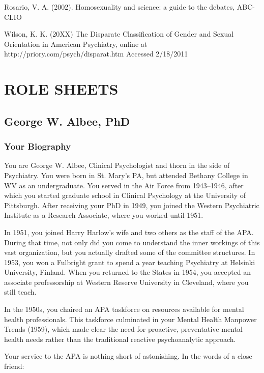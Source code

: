 Rosario, V. A. (2002). Homosexuality and science: a guide to the debates, ABC-CLIO

Wilson, K. K. (20XX) The Disparate Classification of Gender and Sexual Orientation in American Psychiatry, online at http:\slash \slash priory.com\slash psych\slash disparat.htm Accessed 2\slash 18\slash 2011

\pagebreak 

\part{ROLE SHEETS}
\label{rolesheets}

\chapter{George W. Albee, PhD}
\label{georgew.albeephd}

\section{Your Biography}
\label{yourbiography}

You are George W. Albee, Clinical Psychologist and thorn in the side of Psychiatry. You were born in St. Mary's PA, but attended Bethany College in WV as an undergraduate. You served in the Air Force from 1943--1946, after which you started graduate school in Clinical Psychology at the University of Pittsburgh. After receiving your PhD in 1949, you joined the Western Psychiatric Institute as a Research Associate, where you worked until 1951.

In 1951, you joined Harry Harlow's wife and two others as the staff of the APA. During that time, not only did you come to understand the inner workings of this vast organization, but you actually drafted some of the committee structures. In 1953, you won a Fulbright grant to spend a year teaching Psychiatry at Helsinki University, Finland. When you returned to the States in 1954, you accepted an associate professorship at Western Reserve University in Cleveland, where you still teach.

In the 1950s, you chaired an APA taskforce on resources available for mental health professionals. This taskforce culminated in your Mental Health Manpower Trends (1959), which made clear the need for proactive, preventative mental health needs rather than the traditional reactive psychoanalytic approach.

Your service to the APA is nothing short of astonishing. In the words of a close friend:

